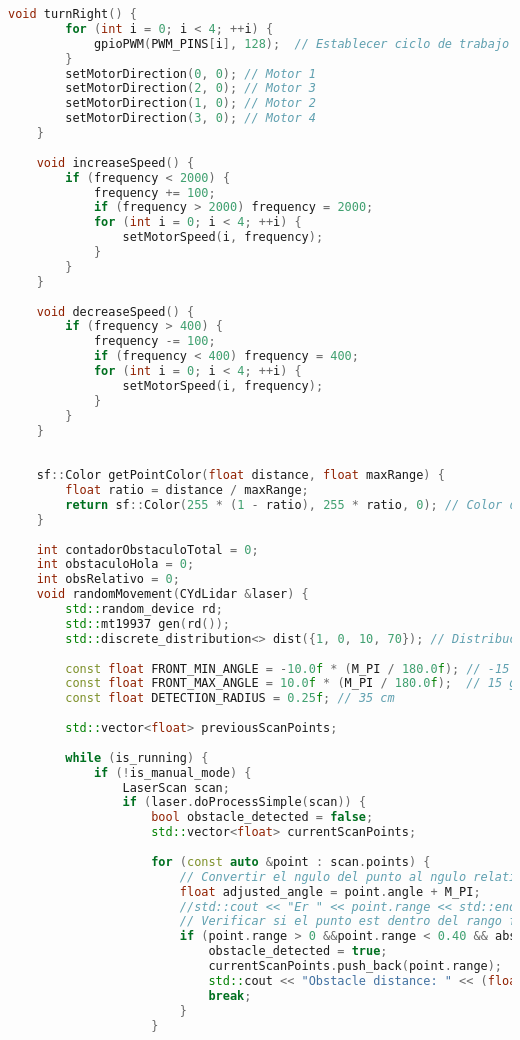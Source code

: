 \begin{lstlisting}[language={C++}, caption={Primer ajuste de c\'odigo}, label={Script}]
    void turnRight() {
        for (int i = 0; i < 4; ++i) {
            gpioPWM(PWM_PINS[i], 128);  // Establecer ciclo de trabajo al 50%
        }
        setMotorDirection(0, 0); // Motor 1
        setMotorDirection(2, 0); // Motor 3
        setMotorDirection(1, 0); // Motor 2
        setMotorDirection(3, 0); // Motor 4
    }
    
    void increaseSpeed() {
        if (frequency < 2000) {
            frequency += 100;
            if (frequency > 2000) frequency = 2000;
            for (int i = 0; i < 4; ++i) {
                setMotorSpeed(i, frequency);
            }
        }
    }
    
    void decreaseSpeed() {
        if (frequency > 400) {
            frequency -= 100;
            if (frequency < 400) frequency = 400;
            for (int i = 0; i < 4; ++i) {
                setMotorSpeed(i, frequency);
            }
        }
    }
    
    
    sf::Color getPointColor(float distance, float maxRange) {
        float ratio = distance / maxRange;
        return sf::Color(255 * (1 - ratio), 255 * ratio, 0); // Color de rojo a verde
    }
    
    int contadorObstaculoTotal = 0;
    int obstaculoHola = 0;
    int obsRelativo = 0;
    void randomMovement(CYdLidar &laser) {
        std::random_device rd;
        std::mt19937 gen(rd());
        std::discrete_distribution<> dist({1, 0, 10, 70}); // Distribucin para la probabilidad de movimiento
    
        const float FRONT_MIN_ANGLE = -10.0f * (M_PI / 180.0f); // -15 grados en radaianes
        const float FRONT_MAX_ANGLE = 10.0f * (M_PI / 180.0f);  // 15 grados en radianes
        const float DETECTION_RADIUS = 0.25f; // 35 cm
    
        std::vector<float> previousScanPoints;
    
        while (is_running) {
            if (!is_manual_mode) {
                LaserScan scan;
                if (laser.doProcessSimple(scan)) {
                    bool obstacle_detected = false;
                    std::vector<float> currentScanPoints;
                    
                    for (const auto &point : scan.points) {
                        // Convertir el ngulo del punto al ngulo relativo al "sur" del robot
                        float adjusted_angle = point.angle + M_PI;
                        //std::cout << "Er " << point.range << std::endl;
                        // Verificar si el punto est dentro del rango frontal de 30
                        if (point.range > 0 &&point.range < 0.40 && abs(point.angle) < adjusted_angle) {
                            obstacle_detected = true;
                            currentScanPoints.push_back(point.range);
                            std::cout << "Obstacle distance: " << (float)point.range  << " Y en el angulo  "<<point.angle << std::endl;
                            break;
                        }
                    }
                    

\end{lstlisting}
